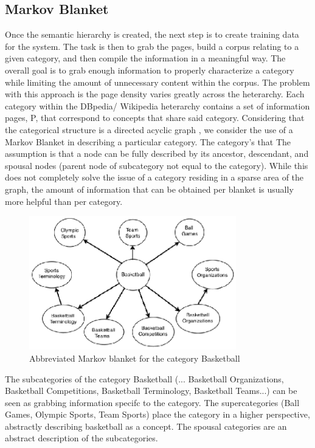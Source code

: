 \documentclass{www2010-submission}
\begin{document}
\subsection{Markov Blanket}
Once the semantic hierarchy is created, the next step is to create training data for the system. The task is then to grab the pages, build a corpus relating to a given category, and then compile the information in a meaningful way. The overall goal is to grab enough information to properly characterize a category while limiting the amount of unnecessary content within the corpus. The problem with this approach is the page density varies greatly across the heterarchy. Each category within the DBpedia/ Wikipedia heterarchy contains a set of information pages, P, that correspond to concepts that share said category. Considering that the categorical structure is a directed acyclic graph \cite{Suchanek07yago:a}, we consider the use of a Markov Blanket \cite{Friedman97bayesiannetwork} in describing a particular category. The category's that The assumption is that a node can be fully described by its ancestor, descendant, and spousal nodes (parent node of subcategory not equal to the category). While this does not completely solve the issue of a category residing in a sparse area of the graph, the amount of information that can be obtained per blanket is usually more helpful than per category.

\begin{figure}[t]
\centering
\includegraphics[width=90mm]{abbrv_bb_blanket.eps}
\caption{Abbreviated Markov blanket for the category Basketball}
\label{fig:abbrv_bb_blanket}
\end{figure}

The subcategories of the category Basketball (... Basketball Organizations, Basketball Competitions, Basketball Terminology, Basketball Teams...) can be seen as grabbing information specifc to the category. The supercategories (Ball Games, Olympic Sports, Team Sports) place the category in a higher perspective, abstractly describing basketball as a concept. The spousal categories are an abstract description of the subcategories.
\end{document}
